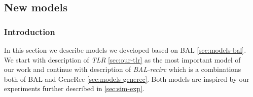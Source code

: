\subsection{New models}
\label{sec:sim-our} 

\subsubsection*{Introduction} 
In this section we describe models we developed based on BAL \ref{sec:models-bal}. We start with description of \emph{TLR} \ref{sec:our-tlr} as the most important model of our work and continue with description of \emph{BAL-recirc} which is a combinations both of BAL and GeneRec \ref{sec:models-generec}. Both models are inspired by our experiments further described in \ref{sec:sim-exp}. 

 



